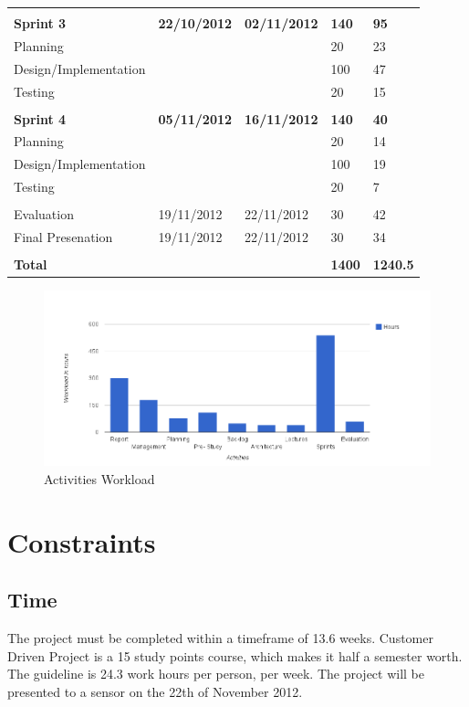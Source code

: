 \begin{table}
\begin{tabular}{ l l l l l }
\hline \\ [-2.0ex]
 \bf{Sprint 3}			&\bf{22/10/2012}	&\bf{02/11/2012}	&\bf{140}		&\bf{95}		\\
 Planning				&				&				&20			&23		\\
 Design/Implementation	&				&				&100		&47		\\
 Testing				&				&				&20			&15		\\
\hline \\ [-2.0ex]
 \bf{Sprint 4}			&\bf{05/11/2012}	&\bf{16/11/2012}	&\bf{140}		&\bf{40}		\\
 Planning				&				&				&20			&14		\\
 Design/Implementation	&				&				&100		&19		\\
 Testing				&				&				&20			&7		\\
\hline \\ [-2.0ex]
 Evaluation			&19/11/2012		&22/11/2012		&30			&42		\\
 Final Presenation		&19/11/2012		&22/11/2012		&30			&34		\\
\hline \\ [-2.0ex]
 \bf{Total}			&				&				&\bf{1400}	&\bf{1240.5}		\\
\hline
\end{tabular}
\label{table:wbs}
\end{table}

\begin{figure}[H]
\centering
\includegraphics[width=5in]{image/workload.png}
\caption{Activities Workload}
\label{figure:workload}
\end{figure}


\section{Constraints}
\subsection{Time}
The project must be completed within a timeframe of 13.6 weeks. Customer Driven Project is a 15 study points course, which makes it half a semester worth. The guideline is 24.3 work hours per person, per week. The project will be presented to a sensor on the 22th of November 2012.

